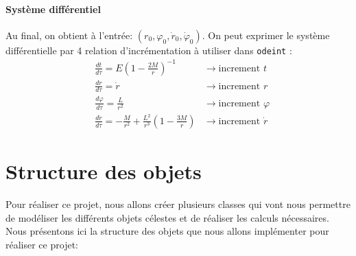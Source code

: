 \documentclass{article}
\begin{document}
\paragraph{Système différentiel} 
Au final, on obtient à l'entrée: $(r_0,\varphi_0,\dot r_0, \dot \varphi_0)$. On peut exprimer le système différentielle par 4 relation d'incrémentation à utiliser dans \texttt{odeint} : 
\begin{align*}
&\frac{dt}{d\tau}=E\left(1-\frac{2M}{r}\right)^{-1}&\to\text{increment } t\\
&\frac{dr}{d\tau}=\dot r&\to\text{increment } r\\
&\frac{d\varphi}{d\tau}=\frac{L}{r^2}&\to\text{increment }\varphi\\
&\frac{d\dot r}{d\tau}=-\frac{M}{r^2}+\frac{L^2}{r^3}\left(1-\frac{3M}{r}\right)&\to\text{increment } \dot r
\end{align*}
\newpage
\section{Structure des objets}

Pour réaliser ce projet, nous allons créer plusieurs classes qui vont nous permettre de modéliser les différents objets célestes et de réaliser les calculs nécessaires. \\

Nous présentons ici la structure des objets que nous allons implémenter pour réaliser ce projet:
\end{document}
